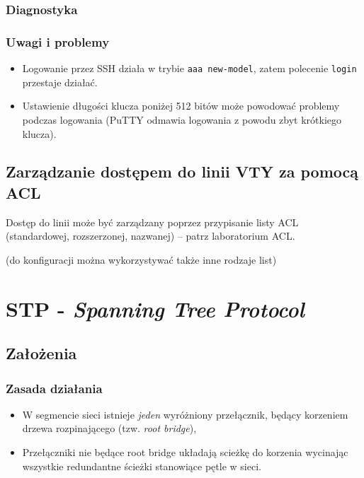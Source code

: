 \subsubsection{Diagnostyka}

\subsubsection{Uwagi i problemy}
\begin{itemize}
	\item Logowanie przez SSH działa w trybie \texttt{aaa new-model}, zatem polecenie \texttt{login} przestaje działać.
	\item Ustawienie długości klucza poniżej 512 bitów może powodować problemy podczas logowania (PuTTY odmawia logowania z powodu zbyt krótkiego klucza).
\end{itemize}

\subsection{Zarządzanie dostępem do linii VTY za pomocą ACL}
Dostęp do linii może być zarządzany poprzez przypisanie listy ACL (standardowej, rozszerzonej, nazwanej) -- patrz laboratorium ACL.


 (do konfiguracji można wykorzystywać także inne rodzaje list)

\section{STP - \textit{Spanning Tree Protocol}}

\subsection{Założenia}
\subsubsection{Zasada działania}
\begin{itemize}
	\item W segmencie sieci istnieje \textit{jeden} wyróżniony przełącznik, będący korzeniem drzewa rozpinającego (tzw. \textit{root bridge}),
	\item Przełączniki nie będące root bridge układają scieżkę do korzenia wycinając wszystkie redundantne ścieżki stanowiące pętle w sieci.
\end{itemize}
